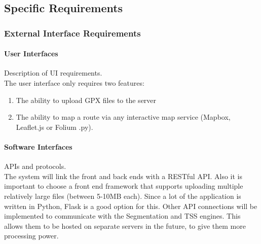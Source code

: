 \documentclass[11pt,twoside]{report}
\begin{document}
\subsection{Specific Requirements}
\label{sec:specific}
\subsubsection{External Interface Requirements}
\paragraph{User Interfaces} Description of UI requirements.\\
The user interface only requires two features:
\begin{enumerate}
	\item The ability to upload GPX files to the server
	\item The ability to map a route via any interactive map service (Mapbox, Leaflet.js or Folium \citep{folium}.py).
\end{enumerate}
\paragraph{Software Interfaces} APIs and protocols.\\
The system will link the front and back ends with a RESTful API. Also it is important to choose a front end framework
that supports uploading multiple relatively large files (between 5-10MB each). Since a lot of the application is written in Python,
Flask is a good option for this.
Other API connections will be implemented to communicate with the Segmentation and TSS engines. This allows them to be hosted on separate servers
in the future, to give them more processing power.
\end{document}

